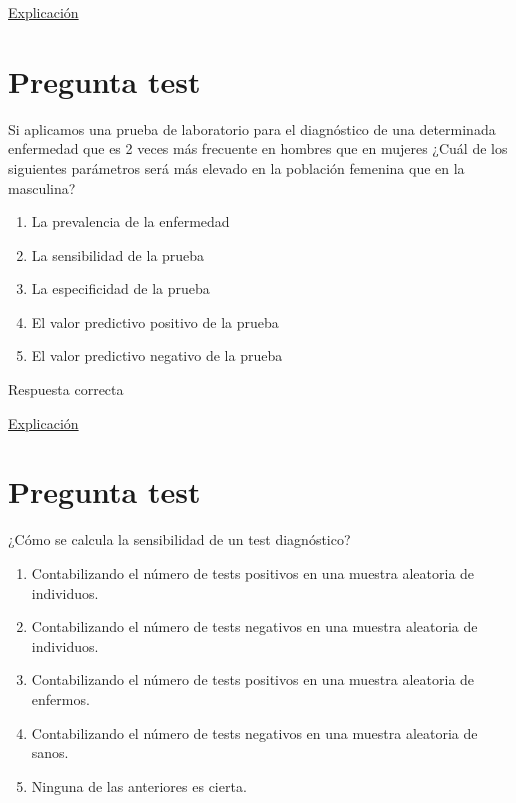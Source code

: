 \documentclass[
]{book}
\providecommand{\tightlist}{%
  \setlength{\itemsep}{0pt}\setlength{\parskip}{0pt}}
\begin{document}
\href{https://1fjmanzano.github.io/bioestadistica/relaci\%C3\%B3n-entre-variables-cualitativas.html\#diagno\%CC\%81stico-cli\%CC\%81nico}{Explicación}

\hypertarget{pregunta-test-114}{%
\section{Pregunta test}\label{pregunta-test-114}}

Si aplicamos una prueba de laboratorio para el diagnóstico de una determinada enfermedad que es 2 veces más frecuente en hombres que en mujeres ¿Cuál de los siguientes parámetros será más elevado en la población femenina que en la masculina?

\begin{enumerate}
\def\labelenumi{\alph{enumi})}
\tightlist
\item
  La prevalencia de la enfermedad
\item
  La sensibilidad de la prueba
\item
  La especificidad de la prueba
\item
  El valor predictivo positivo de la prueba
\item
  El valor predictivo negativo de la prueba
\end{enumerate}

Respuesta correcta

\href{https://1fjmanzano.github.io/bioestadistica/relaci\%C3\%B3n-entre-variables-cualitativas.html\#diagno\%CC\%81stico-cli\%CC\%81nico}{Explicación}

\hypertarget{pregunta-test-115}{%
\section{Pregunta test}\label{pregunta-test-115}}

¿Cómo se calcula la sensibilidad de un test diagnóstico?

\begin{enumerate}
\def\labelenumi{\alph{enumi})}
\tightlist
\item
  Contabilizando el número de tests positivos en una muestra aleatoria de individuos.
\item
  Contabilizando el número de tests negativos en una muestra aleatoria de individuos.
\item
  Contabilizando el número de tests positivos en una muestra aleatoria de enfermos.
\item
  Contabilizando el número de tests negativos en una muestra aleatoria de sanos.
\item
  Ninguna de las anteriores es cierta.
\end{enumerate}
\end{document}
